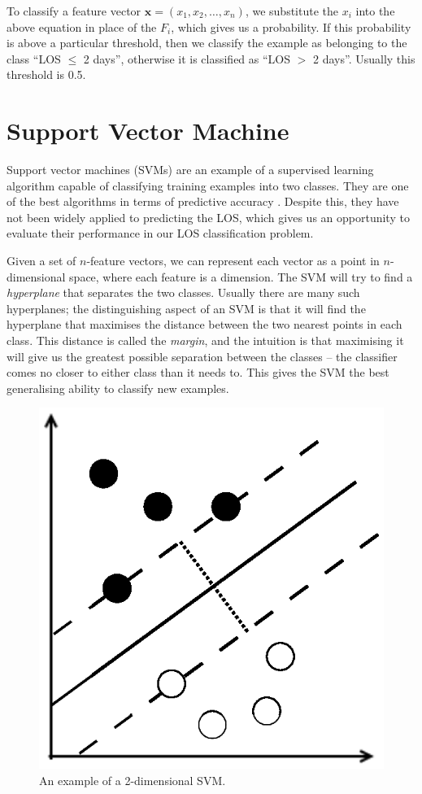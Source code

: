 To classify a feature vector $\mathbf{x} = (x_1,x_2,\ldots,x_n)$, we substitute the
$x_i$ into the above equation in place of the $F_i$, which gives us a
probability. If this probability is above a particular threshold, then we
classify the example as belonging to the class ``LOS $\leq$ 2 days'', otherwise
it is classified as ``LOS $>$ 2 days''. Usually this threshold is 0.5.

\section{Support Vector Machine}
Support vector machines (SVMs) are an example of a supervised learning algorithm
capable of classifying training examples into two classes. They are one of the
best algorithms in terms of predictive accuracy \cite{Bellazzi2008}. Despite
this, they have not been widely applied to predicting the LOS, which gives us
an opportunity to evaluate their performance in our LOS classification problem.

Given a set of $n$-feature vectors, we can represent each vector as a point in
$n$-dimensional space, where each feature is a dimension. The SVM will try to
find a \textit{hyperplane} that separates the two classes. Usually there are
many such hyperplanes; the distinguishing aspect of an SVM is that it will
find the hyperplane that maximises the distance between the two nearest points
in each class. This distance is called the \textit{margin}, and the intuition
is that maximising it will give us the greatest possible separation between the
classes -- the classifier comes no closer to either class than it needs to.
This gives the SVM the best generalising ability to classify new examples.
\begin{figure}[h]
\includegraphics{images/method/svm-example.eps}
\caption{An example of a 2-dimensional SVM.}
\label{fig:svm}
\end{figure}

